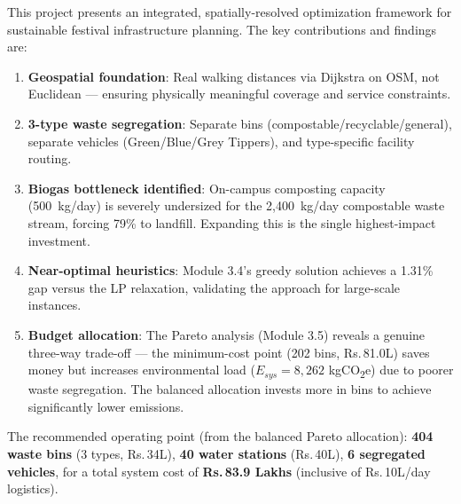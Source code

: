 \documentclass[11pt,a4paper]{article}
\begin{document}
This project presents an integrated, spatially-resolved optimization framework for sustainable festival infrastructure planning. The key contributions and findings are:

\begin{enumerate}
    \item \textbf{Geospatial foundation}: Real walking distances via Dijkstra on OSM, not Euclidean --- ensuring physically meaningful coverage and service constraints.
    \item \textbf{3-type waste segregation}: Separate bins (compostable/recyclable/general), separate vehicles (Green/Blue/Grey Tippers), and type-specific facility routing.
    \item \textbf{Biogas bottleneck identified}: On-campus composting capacity (500~kg/day) is severely undersized for the 2,400~kg/day compostable waste stream, forcing 79\% to landfill. Expanding this is the single highest-impact investment.
    \item \textbf{Near-optimal heuristics}: Module 3.4's greedy solution achieves a 1.31\% gap versus the LP relaxation, validating the approach for large-scale instances.
    \item \textbf{Budget allocation}: The Pareto analysis (Module 3.5) reveals a genuine three-way trade-off --- the minimum-cost point (202 bins, Rs.\,81.0L) saves money but increases environmental load ($E_{sys} = 8{,}262$ kgCO\textsubscript{2}e) due to poorer waste segregation. The balanced allocation invests more in bins to achieve significantly lower emissions.
\end{enumerate}

The recommended operating point (from the balanced Pareto allocation): \textbf{404 waste bins} (3 types, Rs.\,34L), \textbf{40 water stations} (Rs.\,40L), \textbf{6 segregated vehicles}, for a total system cost of \textbf{Rs.\,83.9 Lakhs} (inclusive of Rs.\,10L/day logistics).
\end{document}
